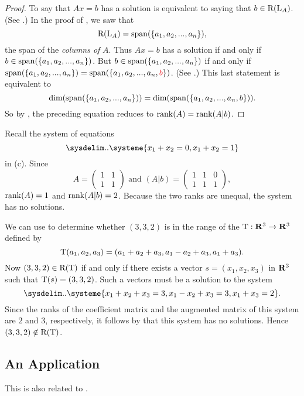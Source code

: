 \begin{proof}
To say that \(Ax = b\) has a solution is equivalent to saying that \(b \in \mathrm{R}(\mathrm{L}_A)\).
(See .)
In the proof of , we saw that
\[
    \mathrm{R}(\mathrm{L}_A) = \operatorname{span}(\{ a_1, a_2, ..., a_n \}),
\]
the span of the \emph{columns of} \(A\).
Thus \(Ax = b\) has a solution if and only if \(b \in \operatorname{span}(\{ a_1, a_2, ..., a_n \})\).
But \(b \in \operatorname{span}(\{ a_1, a_2, ... , a_n \})\) if and only if \(\spann(\{ a_1, a_2, ..., a_n \}) = \spann(\{ a_1, a_2, ..., a_n, \RED{b} \})\). (See .)
This last statement is equivalent to
\[
    \dim(\operatorname{span}(\{ a_1, a_2, ..., a_n \})) = \dim(\operatorname{span}(\{ a_1, a_2, ..., a_n, b \})).
\]
So by , the preceding equation reduces to \(\mathrm{rank}(A) = \mathrm{rank}(A | b)\).
\end{proof}

\begin{example} \label{example 3.3.5}
Recall the system of equations
\[
    \sysdelim..\systeme{
        x_1 + x_2 = 0,
        x_1 + x_2 = 1
    }
\]
in (c).
Since
\[
    A = \begin{pmatrix} 1 & 1 \\ 1 & 1 \end{pmatrix}
    \text{ and }
    (A | b) = \begin{pmatrix} 1 & 1 & 0 \\ 1 & 1 & 1 \end{pmatrix},
\]
\(\mathrm{rank}(A) = 1\) and \(\mathrm{rank}(A|b) = 2\).
Because the two ranks are unequal, the system has no solutions.
\end{example}

\begin{example} \label{example 3.3.6}
We can use  to determine whether \((3, 3, 2)\) is in the range of the \LTRAN{} \(\mathrm{T} : \mathbf{R}^3 \to \mathbf{R}^3\) defined by
\[
    \mathrm{T}(a_1, a_2, a_3) = (a_1 + a_2 + a_3, a_1 - a_2 + a_3, a_1 + a_3).
\]
Now \((3, 3, 2) \in \mathrm{R(T)}\) if and only if there exists a vector \(s = (x_1, x_2, x_3)\) in \(\mathbf{R}^3\) such that \(\mathrm{T}(s) = (3, 3, 2)\).
Such a vectors must be a solution to the system
\[
    \sysdelim..\systeme{
        x_1 + x_2 + x_3 = 3,
        x_1 - x_2 + x_3 = 3,
        x_1       + x_3 = 2
    }.
\]
Since the ranks of the coefficient matrix and the augmented matrix of this system are \(2\) and \(3\), respectively, it follows by  that this system has no solutions.
Hence \((3, 3, 2) \notin \mathrm{R(T)}\).
\end{example}

\subsection{An Application}
\begin{note}
This is also related to .
\end{note}

